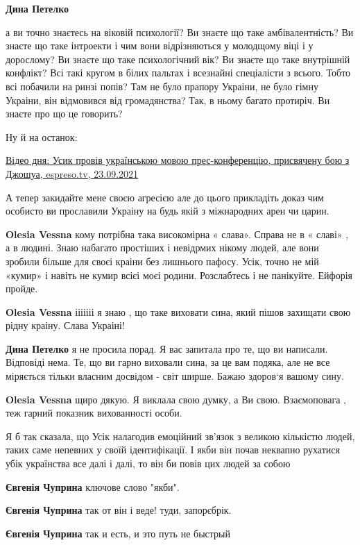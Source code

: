 \begin{itemize}
\begin{itemize} %
\textbf{Дина Петелко} 

а ви точно знаєтесь на віковій психології? Ви знаєте що таке амбівалентність?
Ви знаєте що таке інтроекти і чим вони відрізняються у молодщому віці і у
дорослому? Ви знаєте що таке психологічний вік? Ви знаєте що таке внутрішній
конфлікт? Всі такі кругом в білих пальтах і всезнайні спеціалісти з всього.
Тобто всі побачили на ринзі попів? Там не було прапору Украіни, не було гімну
Украіни, він відмовився від громадянства? Так, в ньому багато протиріч. Ви
знаєте про що це говорить?

Ну й на останок:

\href{https://espreso.tv/video-dnya-usik-proviv-ukrainskoyu-movoyu-pres-konferentsiyu-prisvyachenu-boyu-z-dzhoshua}{%
Відео дня: Усик провів українською мовою прес-конференцію, присвячену бою з Джошуа, espreso.tv, 23.09.2021%
}

А тепер закидайте мене своєю агресією але до цього прикладіть доказ чим
особисто ви прославили Украіну на будь якій з міжнародних арен чи царин.

\textbf{Olesia Vessna} кому потрібна така високомірна « слава». Справа не в « славі» , а в людині. Знаю набагато простіших і невідрмих нікому людей, але вони зробили більше для своєі краіни без лишнього пафосу. Усік, точно не мій «кумир» і навіть не кумир всієі моєі родини. Розслабтесь і не панікуйте. Ейфорія пройде.

\textbf{Olesia Vessna} ііііііі я знаю , що таке виховати сина, який пішов захищати свою рідну краіну. Слава Украіні!

\textbf{Дина Петелко} я не просила порад. Я вас запитала про те, що ви написали. Відповіді нема. Те, що ви гарно виховали сина, за це вам подяка, але не все міряється тільки власним досвідом - світ ширше. Бажаю здоров‘я вашому сину.

\textbf{Olesia Vessna} щиро дякую. Я виклала свою
думку, а Ви свою. Взаємоповага , теж гарний показник вихованності особи.
\end{itemize} %


Я б так сказала, що Усік налагодив емоційний зв'язок з великою кількістю людей,
таких саме непевних у своїй ідентифікації. І якби він почав неквапно рухатися
убік українства все далі і далі, то він би повів цих людей за собою

\begin{itemize} %
\textbf{Євгенія Чуприна} ключове слово "якби".

\textbf{Євгенія Чуприна} так от він і веде!
туди, запорєбрік.

\textbf{Євгенія Чуприна} так и есть, и это путь не быстрый
\end{itemize} %

\end{itemize} %

